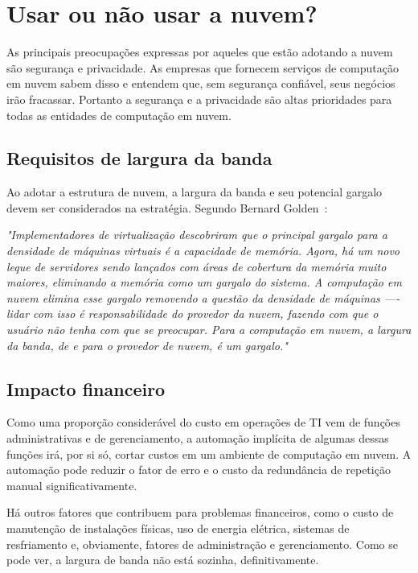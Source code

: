 \section{Usar ou não usar a nuvem?}

As principais preocupações expressas por aqueles que estão adotando a nuvem são
segurança e privacidade. As empresas que fornecem serviços de computação em nuvem
sabem disso e entendem que, sem segurança confiável, seus negócios irão
fracassar. Portanto a segurança e a privacidade são altas prioridades para todas as
entidades de computação em nuvem.


\subsection{Requisitos de largura da banda}

Ao adotar a estrutura de nuvem, a largura da banda e seu potencial gargalo devem ser 
considerados na estratégia. Segundo Bernard 
Golden~\cite{cio-cloud-computing-bottleneck}:

\begin{displayquote}
\emph{
    "Implementadores de virtualização descobriram que o principal gargalo para a 
    densidade de máquinas virtuais é a capacidade de memória. Agora, há um novo
    leque de servidores sendo lançados com áreas de cobertura da memória muito
    maiores, eliminando a memória como um gargalo do sistema. A computação em nuvem
    elimina esse gargalo removendo a questão da densidade de máquinas —- lidar com
    isso é responsabilidade do provedor da nuvem, fazendo com que o usuário não tenha
    com que se preocupar.
    Para a computação em nuvem, a largura da banda, de e para o provedor de nuvem,
    é um gargalo."
}
\end{displayquote}


\subsection{Impacto financeiro}

Como uma proporção considerável do custo em operações de TI vem de funções
administrativas e de gerenciamento, a automação implícita de algumas dessas
funções irá, por si só, cortar custos em um ambiente de computação em nuvem.
A automação pode reduzir o fator de erro e o custo da redundância de repetição
manual significativamente. 

Há outros fatores que contribuem para problemas financeiros, como o custo de
manutenção de instalações físicas, uso de energia elétrica, sistemas de
resfriamento e, obviamente, fatores de administração e gerenciamento. Como se
pode ver, a largura de banda não está sozinha, definitivamente.
